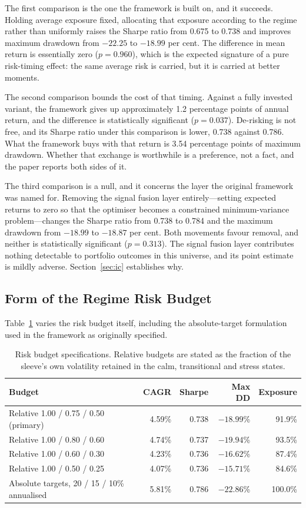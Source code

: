 The first comparison is the one the framework is built on, and it succeeds. Holding
average exposure fixed, allocating that exposure according to the regime rather than
uniformly raises the Sharpe ratio from 0.675 to 0.738 and improves maximum drawdown
from $-22.25$ to $-18.99$ per cent. The difference in mean return is essentially zero
($p = 0.960$), which is the expected signature of a pure risk-timing effect: the same
average risk is carried, but it is carried at better moments.

The second comparison bounds the cost of that timing. Against a fully invested variant,
the framework gives up approximately 1.2 percentage points of annual return, and the difference is
statistically significant ($p = 0.037$). De-risking is not free, and its Sharpe ratio
under this comparison is lower, 0.738 against 0.786. What the framework buys with that
return is 3.54 percentage points of maximum drawdown. Whether that exchange is
worthwhile is a preference, not a fact, and the paper reports both sides of it.

The third comparison is a null, and it concerns the layer the original framework was
named for. Removing the signal fusion layer entirely---setting expected returns to
zero so that the optimiser becomes a constrained minimum-variance problem---changes the
Sharpe ratio from 0.738 to 0.784 and the maximum drawdown from $-18.99$ to $-18.87$ per
cent. Both movements favour removal, and neither is statistically significant
($p = 0.313$). The signal fusion layer contributes nothing detectable to portfolio
outcomes in this universe, and its point estimate is mildly adverse.
Section~\ref{sec:ic} establishes why.

\subsection{Form of the Regime Risk Budget}

Table~\ref{tab:budget} varies the risk budget itself, including the absolute-target formulation used
in the framework as originally specified.

\begin{table}[!ht]
\centering
\caption{Risk budget specifications. Relative budgets are stated as the fraction of the
sleeve's own volatility retained in the calm, transitional and stress states.}
\label{tab:budget}
\small
\begin{tabular}{p{4.6cm}rrrr}
\hline
\textbf{Budget} & \textbf{CAGR} & \textbf{Sharpe} & \textbf{Max DD} & \textbf{Exposure} \\
\hline
Relative 1.00 / 0.75 / 0.50 (primary) & 4.59\% & 0.738 & $-18.99$\% & 91.9\% \\
Relative 1.00 / 0.80 / 0.60 & 4.74\% & 0.737 & $-19.94$\% & 93.5\% \\
Relative 1.00 / 0.60 / 0.30 & 4.23\% & 0.736 & $-16.62$\% & 87.4\% \\
Relative 1.00 / 0.50 / 0.25 & 4.07\% & 0.736 & $-15.71$\% & 84.6\% \\
Absolute targets, 20 / 15 / 10\% annualised & 5.81\% & 0.786 & $-22.86$\% & 100.0\% \\
\hline
\end{tabular}
\end{table}

